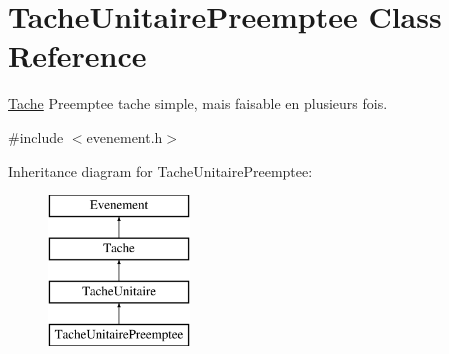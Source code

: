 \hypertarget{class_tache_unitaire_preemptee}{}\section{Tache\+Unitaire\+Preemptee Class Reference}
\label{class_tache_unitaire_preemptee}


\hyperlink{class_tache}{Tache} Preemptee tache simple, mais faisable en plusieurs fois.  




{\ttfamily \#include $<$evenement.\+h$>$}

Inheritance diagram for Tache\+Unitaire\+Preemptee\+:\begin{figure}[H]
\begin{center}
\leavevmode
\includegraphics[height=4.000000cm]{class_tache_unitaire_preemptee}
\end{center}
\end{figure}
